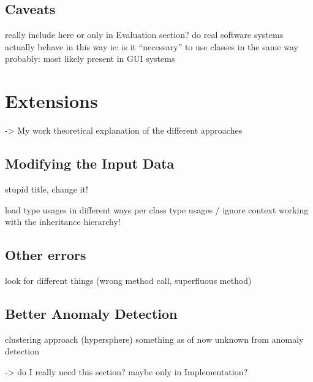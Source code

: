 \subsection{Caveats}
really include here or only in Evaluation section?
do real software systems actually behave in this way
ie: is it ``necessary'' to use classes in the same way
probably: most likely present in GUI systems

\section{Extensions}
-> My work
theoretical explanation of the different approaches

\subsection{Modifying the Input Data}
stupid title, change it!

load type usages in different ways
    per class type usages / ignore context
    working with the inheritance hierarchy!

\subsection{Other errors}
    look for different things (wrong method call, superfluous method)

\subsection{Better Anomaly Detection}
    clustering approach (hypersphere)
    something as of now unknown from anomaly detection

    -> do I really need this section? maybe only in Implementation?
